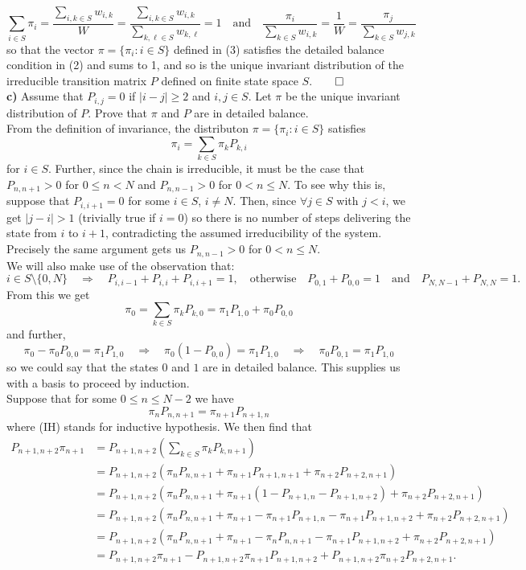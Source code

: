 \documentclass[11pt, letterpaper]{article}
\begin{document}
    \[\sum_{i\in S}\pi_i=\frac{\sum_{i,k\in S}w_{i,k}}{W}=\frac{\sum_{i,k\in S}w_{i,k}}{\sum_{k,\ell\in S}w_{k,\ell}}=1\quad\text{and}\quad \frac{\pi_i}{\sum_{k\in S}w_{i,k}}=\frac{1}{W}=\frac{\pi_j}{\sum_{k\in S}w_{j,k}}\]
    so that the vector $\pi=\{\pi_i:i\in S\}$ defined in (3) satisfies the detailed balance condition in (2) and sums to 1, and so is the unique invariant distribution of the irreducible transition matrix $P$ defined on finite state space $S$.\hfill{$\qed$}\\[10pt]
    {\bf c)} Assume that $P_{i,j}=0$ if $|i-j|\geq2$ and $i,j\in S$. Let $\pi$ be the unique invariant distribution of $P$. Prove that $\pi$ and $P$ are in detailed balance.\\[10pt]
    From the definition of invariance, the distributon $\pi=\{\pi_i:i\in S\}$ satisfies
    \[\pi_i=\sum_{k\in S}\pi_k P_{k,i}\]
    for $i\in S$. Further, since the chain is irreducible, it must be the case that $P_{n,n+1}>0$ for $0\leq n<N$ and $P_{n,n-1}>0$ for $0<n\leq N$. To see why this is, suppose that $P_{i,i+1}=0$ for some $i\in S$, $i\neq N$. Then, since $\forall j\in S$ with $j<i$, we get $|j-i|>1$ (trivially true if $i=0$) so there is no number of steps
    delivering the state from $i$ to $i+1$, contradicting the assumed irreducibility of the system. Precisely the same argument gets us $P_{n,n-1}>0$ for $0<n\leq N$.\\[10pt]
    We will also make use of the observation that:
    \[i\in S\setminus\{0,N\}\quad\Rightarrow\quad P_{i,i-1}+P_{i,i}+P_{i,i+1}=1,\quad\text{otherwise}\quad P_{0,1}+P_{0,0}=1\quad\text{and}\quad P_{N,N-1}+P_{N,N}=1.\tag{4}\]
    From this we get
    \[\pi_0=\sum_{k\in S}\pi_kP_{k,0}=\pi_1P_{1,0}+\pi_0P_{0,0}\]
    and further,
    \[\pi_0-\pi_0P_{0,0}=\pi_1P_{1,0}\quad\Rightarrow\quad\pi_0(1-P_{0,0})=\pi_1P_{1,0}\quad\Rightarrow\quad \pi_0 P_{0,1}=\pi_1 P_{1,0}\]
    so we could say that the states $0$ and $1$ are in detailed balance. This supplies us with a basis to proceed by induction. \\[10pt]
    Suppose that for some $0\leq n\leq N-2$ we have
    \[\pi_n P_{n,n+1}=\pi_{n+1}P_{n+1,n}\tag{IH}\]
    where (IH) stands for inductive hypothesis. We then find that
    \begin{align*}
        P_{n+1,n+2}\pi_{n+1}&=P_{n+1,n+2}\left(\sum_{k\in S}\pi_kP_{k,n+1}\right)\\
        &=P_{n+1,n+2}(\pi_nP_{n,n+1}+\pi_{n+1}P_{n+1,n+1}+\pi_{n+2}P_{n+2,n+1})\\
        &=P_{n+1,n+2}(\pi_nP_{n,n+1}+\pi_{n+1}(1-P_{n+1,n}-P_{n+1,n+2})+\pi_{n+2}P_{n+2,n+1})\tag{by 4}\\
        &=P_{n+1,n+2}(\pi_nP_{n,n+1}+\pi_{n+1}-\pi_{n+1}P_{n+1,n}-\pi_{n+1}P_{n+1,n+2}+\pi_{n+2}P_{n+2,n+1})\\
        &=P_{n+1,n+2}(\pi_nP_{n,n+1}+\pi_{n+1}-\pi_{n}P_{n,n+1}-\pi_{n+1}P_{n+1,n+2}+\pi_{n+2}P_{n+2,n+1})\tag{IH}\\
        &=P_{n+1,n+2}\pi_{n+1}-P_{n+1,n+2}\pi_{n+1}P_{n+1,n+2}+P_{n+1,n+2}\pi_{n+2}P_{n+2,n+1}.
    \end{align*}
\end{document}
